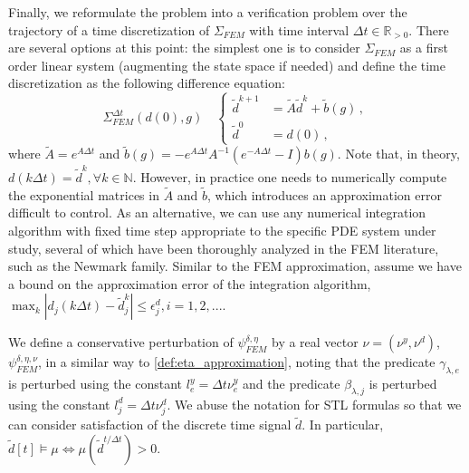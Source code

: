 \documentclass[letterpaper, 10 pt, conference]{ieeeconf/ieeeconf}
\newcommand*{\R}{\mathbb{R}}
\newcommand*{\N}{\mathbb{N}}
\newcommand{\Always}{\mathbf{G}}
\begin{document}
Finally, we reformulate the problem into a verification problem over the
trajectory of a time discretization of $\Sigma_{FEM}$ with time interval $\Delta
t \in \R_{>0}$. There are several options at this point: the simplest one is to
consider $\Sigma_{FEM}$ as a first order linear system (augmenting the state
space if needed) and define the time discretization as the following difference
equation:
%
\begin{equation}
    \label{eq:disc_system}
    \Sigma_{FEM}^{\Delta t}(d(0), g) \quad \left\{
    \begin{aligned}
        \tilde d^{k+1} &= \tilde A \tilde d^k + \tilde b(g) \,, \\
        \tilde d^0 &= d(0) \,,
    \end{aligned}
    \right.
\end{equation}
%
where $\tilde A = e^{A \Delta t}$ and $\tilde b(g) = - e^{A \Delta t} A^{-1} 
( e^{- A \Delta t} - I ) b(g)$. Note that, in theory, $d(k \Delta t) = \tilde d^k,
\forall k \in \N$. However, in practice one needs to numerically compute the
exponential matrices in $\tilde A$ and $\tilde b$, which introduces an
approximation error difficult to control. As an alternative, we can use any
numerical integration algorithm with fixed time step appropriate to the specific
PDE system under study, several of which have been
thoroughly analyzed in the FEM literature, such as the Newmark family. Similar
to the FEM approximation, assume we have a bound on the approximation error of
the integration algorithm, $\max_k |d_j(k \Delta t) - \tilde d^k_j| \leq
\epsilon^d_j, i=1,2,...$.

We define a conservative perturbation of $\psi^{\delta, \eta}_{FEM}$ by a real
vector $\nu = (\nu^y, \nu^d)$, $\psi^{\delta, \eta, \nu}_{FEM}$, in a similar
way to \cref{def:eta_approximation}, noting that the predicate $\gamma_{\lambda, e}$ is perturbed
using the constant $l_e^y = \Delta t \nu^y_e$ and the predicate $\beta_{\lambda, j}$ is
perturbed using the constant $l_j^d = \Delta t \nu^d_j$. We abuse the notation
for STL formulas so that we can consider satisfaction of the discrete time
signal $\tilde{d}$. In particular, $\tilde{d}[t] \models \mu \iff
\mu(\tilde{d}^{t / \Delta t}) > 0$.
\end{document}

